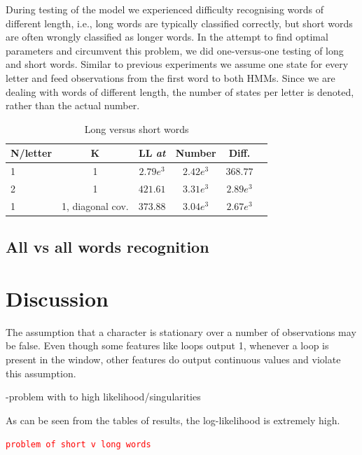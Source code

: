 \documentclass[conference]{IEEEtran}
\newcommand{\todo}[1]{\textcolor{red}{\texttt{#1}}}
\begin{document}
During testing of the model we experienced difficulty recognising words of different length, i.e., long words are typically classified correctly, but short words are often wrongly classified as longer words. In the attempt to find optimal parameters and circumvent this problem, we did one-versus-one testing of long and short words. Similar to previous experiments we assume one state for every letter and feed observations from the first word to both HMMs. Since we are dealing with words of different length, the number of states per letter is denoted, rather than the actual number.
\begin{table}[H]
\centering
\caption{Long versus short words}
 \begin{tabular}{|l|c|c|c|c|r|}\hline
  N/letter 	& K 			& LL {\it at} 	& Number 	& Diff. 	\\\hline
  1		& 1			& $2.79e^3$	&  $2.42e^3$ 	& $368.77$	\\
  2		& 1			& $421.61$	& $3.31e^{3}$	& $2.89e^{3}$	\\
  1		& 1, diagonal cov.	& $373.88$	& $3.04e^3$	& $2.67e^{3}$	\\
 \end{tabular}
\end{table}

\subsection{All vs all words recognition} \label{SubS:ALLvsALL}


\section{Discussion} \label{discussion}
The assumption that a character is stationary over a number of observations may be false. Even though some features like loops output 1, whenever a loop is present in the window, other features do output continuous values and violate this assumption.

-problem with to high likelihood/singularities

As can be seen from the tables of results, the log-likelihood is extremely high. 

\todo{problem of short v long words}



\end{document}
